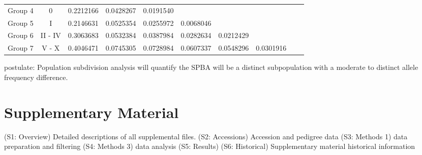 \documentclass[9pt, onecolumn,twoside]{gsajnl}
\begin{document}
\begin{table}[p]
\begin{tableminipage}{\textwidth}
\begin{tabular}{|l|c|l|l|l|l|l|l|l|l}
Group 4                                                                                               & 0              & \cellcolor[HTML]{B5D680}0.2212166             & \cellcolor[HTML]{FDCD7E}0.0428267 & \cellcolor[HTML]{F98B71}0.0191540 & \cellcolor[HTML]{E7E6E6}          & \cellcolor[HTML]{E7E6E6}          & \cellcolor[HTML]{E7E6E6}          & \cellcolor[HTML]{E7E6E6}   &  \\ \cline{1-9}
Group 5                                                                                               & I              & \cellcolor[HTML]{B8D780}0.2146631             & \cellcolor[HTML]{FEE983}0.0525354 & \cellcolor[HTML]{FA9D75}0.0255972 & \cellcolor[HTML]{F8696B}0.0068046 & \cellcolor[HTML]{E7E6E6}          & \cellcolor[HTML]{E7E6E6}          & \cellcolor[HTML]{E7E6E6}   &  \\ \cline{1-9}
Group 6                                                                                               & II - IV        & \cellcolor[HTML]{8FCB7E}0.3063683             & \cellcolor[HTML]{FFEB84}0.0532384 & \cellcolor[HTML]{FCC27C}0.0387984 & \cellcolor[HTML]{FBA576}0.0282634 & \cellcolor[HTML]{FA9172}0.0212429 & \cellcolor[HTML]{E7E6E6}          & \cellcolor[HTML]{E7E6E6}   &  \\ \cline{1-9}
Group 7                                                                                               & V - X          & \cellcolor[HTML]{63BE7B}0.4046471             & \cellcolor[HTML]{F6E984}0.0745305 & \cellcolor[HTML]{F7E984}0.0728984 & \cellcolor[HTML]{FCEB84}0.0607337 & \cellcolor[HTML]{FFEB84}0.0548296 & \cellcolor[HTML]{FBAA77}0.0301916 & \cellcolor[HTML]{E7E6E6}   &  \\ \cline{1-9}
\end{tabular}
  \label{tab:fst2}
\end{tableminipage}
\end{table}


postulate: Population subdivision analysis will quantify the SPBA will be a distinct subpopulation with a moderate to distinct allele frequency difference.

\section{Supplementary Material}
\label{sec:supplementary:material}

(S1: Overview) Detailed descriptions of all supplemental files. 
(S2: Accessions) Accession and pedigree data 
(S3: Methods 1) data preparation and filtering 
(S4: Methods 3) data analysis
(S5: Results)
(S6: Historical) Supplementary material historical information 
\end{document}
